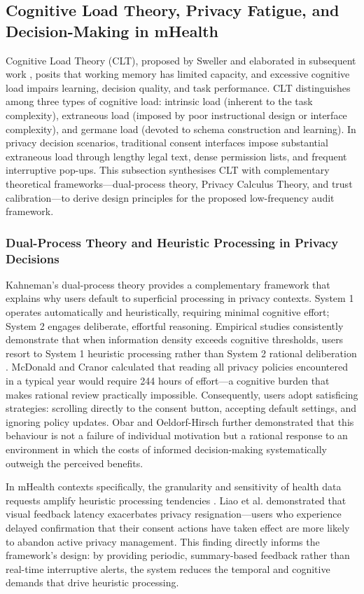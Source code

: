 \subsection{Cognitive Load Theory, Privacy Fatigue, and Decision-Making in mHealth}
Cognitive Load Theory (CLT), proposed by Sweller and elaborated in subsequent work \cite{27}, posits that working memory has limited capacity, and excessive cognitive load impairs learning, decision quality, and task performance. CLT distinguishes among three types of cognitive load: intrinsic load (inherent to the task complexity), extraneous load (imposed by poor instructional design or interface complexity), and germane load (devoted to schema construction and learning). In privacy decision scenarios, traditional consent interfaces impose substantial extraneous load through lengthy legal text, dense permission lists, and frequent interruptive pop-ups. This subsection synthesises CLT with complementary theoretical frameworks—dual-process theory, Privacy Calculus Theory, and trust calibration—to derive design principles for the proposed low-frequency audit framework.

\subsubsection{Dual-Process Theory and Heuristic Processing in Privacy Decisions}
Kahneman's dual-process theory \cite{22} provides a complementary framework that explains why users default to superficial processing in privacy contexts. System 1 operates automatically and heuristically, requiring minimal cognitive effort; System 2 engages deliberate, effortful reasoning. Empirical studies consistently demonstrate that when information density exceeds cognitive thresholds, users resort to System 1 heuristic processing rather than System 2 rational deliberation \cite{12, 13}. McDonald and Cranor \cite{12} calculated that reading all privacy policies encountered in a typical year would require 244 hours of effort—a cognitive burden that makes rational review practically impossible. Consequently, users adopt satisficing strategies: scrolling directly to the consent button, accepting default settings, and ignoring policy updates. Obar and Oeldorf-Hirsch \cite{13} further demonstrated that this behaviour is not a failure of individual motivation but a rational response to an environment in which the costs of informed decision-making systematically outweigh the perceived benefits.

In mHealth contexts specifically, the granularity and sensitivity of health data requests amplify heuristic processing tendencies \cite{14}. Liao et al. \cite{14} demonstrated that visual feedback latency exacerbates privacy resignation—users who experience delayed confirmation that their consent actions have taken effect are more likely to abandon active privacy management. This finding directly informs the framework's design: by providing periodic, summary-based feedback rather than real-time interruptive alerts, the system reduces the temporal and cognitive demands that drive heuristic processing.

